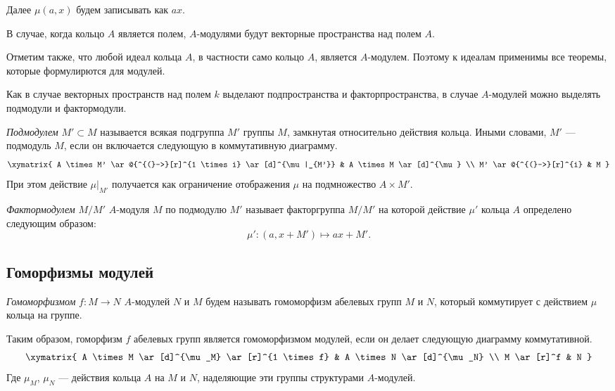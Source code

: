     Далее $\mu(a, x)$ будем записывать как $ax$. 
    
    В случае, когда кольцо $A$ является полем, $A$-модулями будут векторные пространства над полем $A$.
    
    Отметим также, что любой идеал кольца $A$, в частности само кольцо $A$, является $A$-модулем. 
    Поэтому к идеалам применимы все теоремы, которые формулирются для модулей.

    Как в случае векторных пространств над полем $k$ выделают подпространства и факторпространства, в случае $A$-модулей можно выделять подмодули и фактормодули.

    \begin{Def}
        \textit{Подмодулем} $M' \subset M$ называется всякая подгруппа $M'$ группы $M$, замкнутая относительно действия кольца. Иными словами, $M'$ --- подмодуль $M$, 
        если он включается следующую в коммутативную диаграмму.
        $$
        \xymatrix {
            A \times M' \ar@{^{(}->}[r]^{1 \times i} \ar[d]^{\mu |_{M'}} & A \times M \ar[d]^{\mu} \\
            M' \ar@{^{(}->}[r]^{i} & M
        }
        $$
        При этом действие $\mu|_{M'}$ получается как ограничение отображения $\mu$ на подмножество $A \times M'$.
    \end{Def}
    
    \begin{Def}
        \textit{Фактормодулем} $M/M'$ $A$-модуля $M$ по подмодулю $M'$ называет факторгруппа $M/M'$ на которой действие $\mu'$ кольца $A$ определено следующим образом:
        $$
            \mu' : (a, x + M') \mapsto ax + M'.
        $$
    \end{Def}

    \subsection{Гоморфизмы модулей}

    \begin{Def}
        \textit{Гомоморфизмом} $f : M \rightarrow N$ $A$-модулей $N$ и $M$ будем называть гомоморфизм абелевых групп $M$ и $N$, который коммутирует с действием $\mu$ кольца на группе.
    \end{Def} 
    Таким образом, гоморфизм $f$ абелевых групп является гомоморфизмом модулей, если он делает следующую диаграмму коммутативной.
    $$
    \xymatrix{
        A \times M \ar[d]^{\mu_M} \ar[r]^{1 \times f} & A \times N  \ar[d]^{\mu_N} \\
        M \ar[r]^f & N
    }
    $$
    Где $\mu_M$, $\mu_N$ --- действия кольца $A$ на $M$ и $N$, наделяющие эти группы структурами $A$-модулей.

